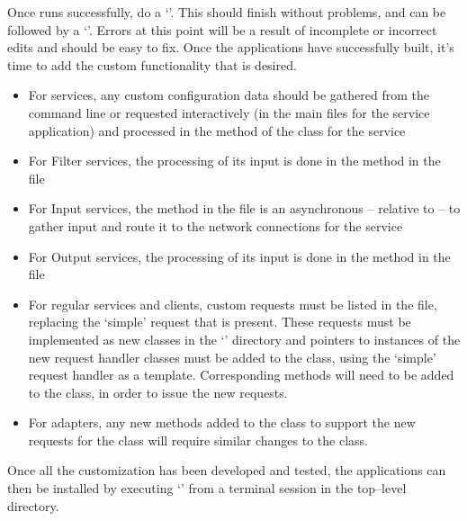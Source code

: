 Once  runs successfully, do a `'.
This should finish without problems, and can be followed by a `'.
Errors at this point will be a result of incomplete or incorrect edits and should be easy
to fix.
\tertiaryEnd{}
Once the applications have successfully built, it's time to add the custom functionality
that is desired.
\begin{itemize}
\item For  services, any custom configuration data should be gathered from
the command line or requested interactively (in the main files for the service
application) and processed in the  method of the class for the service
\item For Filter services, the processing of its input is done in the 
method in the\\
 file
\item For Input services, the  method in the 
file is an asynchronous -- relative to \mplusm{} -- to gather input and route it to the
\yarp{} network connections for the service
\item For Output services, the processing of its input is done in the 
method in the\\
 file
\item For regular services and clients, custom requests must be listed in the
 file, replacing the `simple' request that is present.
These requests must be implemented as new classes in the `' directory
and pointers to instances of the new request handler classes must be added to the
 class, using the `simple' request handler as a template.
Corresponding methods will need to be added to the  class, in order to
issue the new requests.
\item For adapters, any new methods added to the  class to support the
new requests for the  class will require similar changes to the
 class.
\end{itemize}
\tertiaryEnd{}
Once all the customization has been developed and tested, the applications can then be
installed by executing `' from a terminal session in the
top--level directory.
\tertiaryEnd{}
\secondaryEnd{}
\appendixEnd{}
